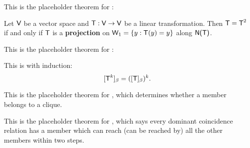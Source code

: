 \begin{additional theorem} \label{athm 2.31}
This is the placeholder theorem for :

Let \(\textsf{V}\) be a vector space and \(\textsf{T} : \textsf{V} \to \textsf{V}\) be a linear transformation.
Then \(\textsf{T} = \textsf{T}^2\) if and only if \(\textsf{T}\) is a \textbf{projection} on \(\textsf{W}_1 = \{ y : \textsf{T}(y) = y \}\)
along \(\textsf{N(T)}\).
\end{additional theorem}

\begin{additional theorem} \label{athm 2.32}
This is the placeholder theorem for :

This is  with induction:
\[
    [\textsf{T}^k]_{\beta} = ([\textsf{T}]_{\beta})^k.
\]
\end{additional theorem}

\begin{additional theorem} \label{athm 2.33}
This is the placeholder theorem for , which determines whether a member belongs to a clique.
\end{additional theorem}

\begin{additional theorem} \label{athm 2.34}
This is the placeholder theorem for , which says every dominant coincidence relation has a member which can reach (can be reached by) all the other members within two steps.
\end{additional theorem}
